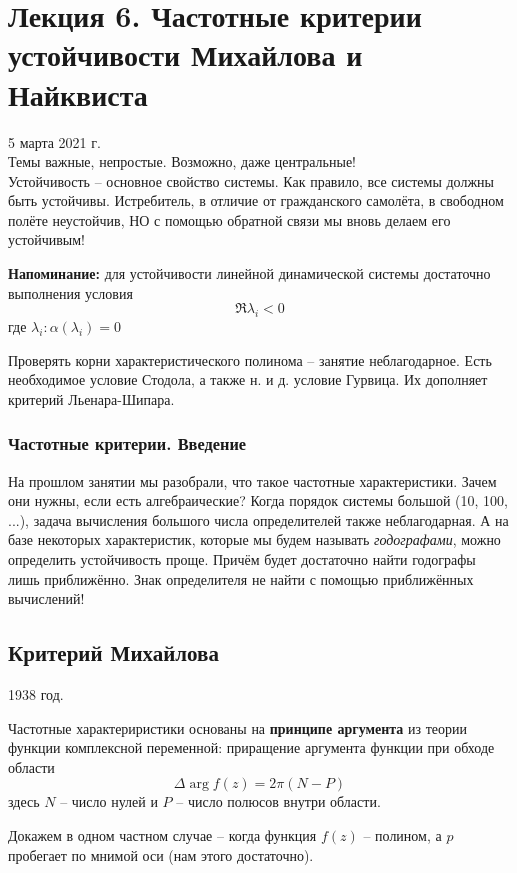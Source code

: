 \documentclass[main.tex]{subfiles}
\begin{document}
\section{Лекция 6. Частотные критерии устойчивости Михайлова и Найквиста }
5 марта 2021 г. \\

Темы важные, непростые.
Возможно, даже центральные! \\

Устойчивость -- основное свойство системы.
Как правило, все системы должны быть устойчивы.
Истребитель, в отличие от гражданского самолёта, в свободном полёте неустойчив, НО с помощью обратной связи мы вновь делаем его устойчивым!

\textbf{Напоминание:} для устойчивости линейной динамической системы достаточно выполнения условия
$$ \boxed{\Re \lambda_i < 0} $$
где $ \lambda_i : \alpha(\lambda_i) = 0 $

Проверять корни характеристического полинома -- занятие неблагодарное.
Есть необходимое условие Стодола, а также н. и д. условие Гурвица.
Их дополняет критерий Льенара-Шипара.

\subsubsection{Частотные критерии. Введение}

На прошлом занятии мы разобрали, что такое частотные характеристики.
Зачем они нужны, если есть алгебраические?
Когда порядок системы большой (10, 100, ...), задача вычисления большого числа определителей также неблагодарная.
А на базе некоторых характеристик, которые мы будем называть \emph{годографами}, можно определить устойчивость проще.
Причём будет достаточно найти годографы лишь приближённо.
Знак определителя не найти с помощью приближённых вычислений!

\subsection{Критерий Михайлова}
1938 год.

Частотные характериристики основаны на \textbf{принципе аргумента} из теории функции комплексной переменной: приращение аргумента функции при обходе области
$$ \Delta \arg f(z) = 2 \pi (N - P) $$
здесь $N$ -- число нулей и $ P $ -- число полюсов внутри области.

Докажем в одном частном случае -- когда функция $f(z)$ -- полином, а $p$ пробегает по мнимой оси (нам этого достаточно).
\end{document}
